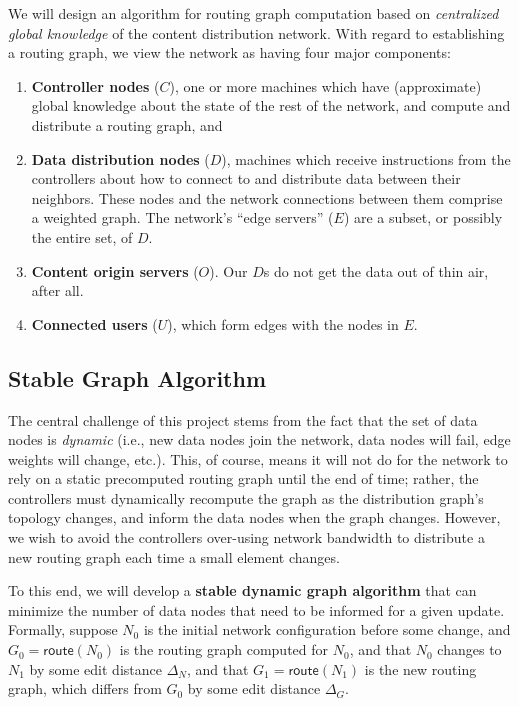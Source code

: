 We will design an algorithm for routing graph computation based on {\em centralized global knowledge} of the content distribution network. With regard to establishing a routing graph, we view the network as having four major components:
\begin{enumerate}
	\item {\bf Controller nodes} ($C$), one or more machines which have (approximate) global knowledge about the state of the rest of the network, and compute and distribute a routing graph, and
	\item {\bf Data distribution nodes} ($D$), machines which receive instructions from the controllers about how to connect to and distribute data between their neighbors.
	These nodes and the network connections between them comprise a weighted graph.
	The network's ``edge servers'' ($E$) are a subset, or possibly the entire set, of $D$.
	\item {\bf Content origin servers} ($O$). Our $D$s do not get the data out of thin air, after all.
	\item {\bf Connected users} ($U$), which form edges with the nodes in $E$.
\end{enumerate}

\subsection{Stable Graph Algorithm}

The central challenge of this project stems from the fact that the set of data nodes is {\em dynamic} (i.e., new data nodes join the network, data nodes will fail, edge weights will change, etc.).
This, of course, means it will not do for the network to rely on a static precomputed routing graph until the end of time; rather, the controllers must dynamically recompute the graph as the distribution graph's topology changes, and inform the data nodes when the graph changes.
However, we wish to avoid the controllers over-using network bandwidth to distribute a new routing graph each time a small element changes.

To this end, we will develop a {\bf stable dynamic graph algorithm} that can minimize the number of data nodes that need to be informed for a given update.
Formally, suppose $N_0$ is the initial network configuration before some change, and $G_0 = \mathsf{route}(N_0)$ is the routing graph computed for $N_0$, and that $N_0$ changes to $N_1$ by some edit distance $\Delta_N$, and that $G_1 = \mathsf{route}(N_1)$ is the new routing graph, which differs from $G_0$ by some edit distance $\Delta_G$.

